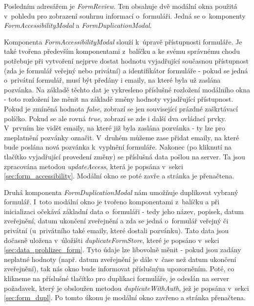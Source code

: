 			\label{sec:modalni_okna_man_form}
			Posledním adresářem je \textit{FormReview}. Ten obsahuje dvě modální okna použitá v~pohledu pro zobrazení souhrnu informací o~formuláři. Jedná se o~komponenty \textit{FormAccessibilityModal} a \textit{FormDuplicationModal}.
			
			Komponenta \textit{FormAccessibilityModal} slouží k~úpravě přístupnosti formuláře. Je také tvořena především komponentami z~balíčku  a ke svému správnému chodu potřebuje při vytvoření nejprve dostat hodnotu vyjadřující současnou přístupnost (zda je formulář veřejný nebo privátní) a identifikátor formuláře - pokud se jedná o~privátní formulář, musí být předány i emaily, na které byla už zaslána pozvánka. Na základě těchto dat je vykresleno příslušné rozložení modálního okna - toto rozložení lze měnit na základě změny hodnoty vyjadřující přístupnost. Pokud je zmíněná hodnota \textit{false}, zobrazí se jen související prázdné zaškrtávací políčko. Pokud se ale rovná \textit{true}, zobrazí se zde i další dva ovládací prvky. V~prvním lze vidět emaily, na které již byla zaslána pozvánka - ty lze pro zneplatnění pozvánky označit. V~druhém můžeme zase přidat emaily, na které bude poslána nová pozvánka k~vyplnění formuláře. Nakonec (po kliknutí na tlačítko vyjadřující provedení změny) se příslušná data pošlou na server. Ta jsou zpracována metodou \textit{updateAccess}, která je popsána v~sekci \ref{sec:form_accessibility}. Modální okno se poté zavře a stránka je přenačtena.
			
			Druhá komponenta \textit{FormDuplicationModal} nám umožňuje duplikovat vybraný formulář. I~toto modální okno je tvořeno komponentami z~balíčku  a při inicializaci očekává základní data o~formuláři - tedy jeho název, popisek, datum zveřejnění, datum ukončení zveřejnění a zda se jedná o~formulář veřejný či privátní (u~privátního také emaily, které dostali pozvánku). Tato data jsou dočasně uložena v~úložišti \textit{duplicateFormStore}, které je popsáno v~sekci \ref{sec:data_prohlizec_form}. Tyto údaje lze libovolně měnit - pokud jsou zadány neplatné hodnoty (např. datum zveřejnění je dále v~čase než datum ukončení zveřejnění), tak nás okno bude informovat příslušným upozorněním. Poté, co klikneme na příslušné tlačítko pro duplikaci formuláře, je odeslán na server požadavek, který je obsloužen metodou \textit{duplicateWithAuth}, jež je popsána v~sekci \ref{sec:form_dupl}. Po tomto úkonu je modální okno zavřeno a stránka přenačtena.
		
